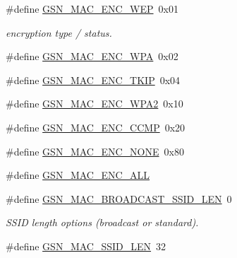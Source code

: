 \begin{DoxyCompactItemize}
\item 
\#define \hyperlink{a00642_ga97e73490c2ebf96dc976cfa9819ca342}{GSN\_\-MAC\_\-ENC\_\-WEP}~0x01
\begin{DoxyCompactList}\small\item\em encryption type / status. \end{DoxyCompactList}\item 
\#define \hyperlink{a00642_ga41cad5522df15c08084272449a15f488}{GSN\_\-MAC\_\-ENC\_\-WPA}~0x02
\item 
\#define \hyperlink{a00642_gae50c827781cd44789ebc5ace15ce7fac}{GSN\_\-MAC\_\-ENC\_\-TKIP}~0x04
\item 
\#define \hyperlink{a00642_gad400c18aedc0468b5338a51ddfd65803}{GSN\_\-MAC\_\-ENC\_\-WPA2}~0x10
\item 
\#define \hyperlink{a00642_gaaec086a1c50b8286b787d02bedd41fbf}{GSN\_\-MAC\_\-ENC\_\-CCMP}~0x20
\item 
\#define \hyperlink{a00642_gaa8b7bb2627d27e63f25be3787fa8abc1}{GSN\_\-MAC\_\-ENC\_\-NONE}~0x80
\item 
\#define \hyperlink{a00642_gae6f462d0bcd3c5811fb25ec43699b8c8}{GSN\_\-MAC\_\-ENC\_\-ALL}
\end{DoxyCompactItemize}
\begin{DoxyCompactItemize}
\item 
\#define \hyperlink{a00642_gaa9374ba371dac462bbc520ad04eb91a1}{GSN\_\-MAC\_\-BROADCAST\_\-SSID\_\-LEN}~0
\begin{DoxyCompactList}\small\item\em SSID length options (broadcast or standard). \end{DoxyCompactList}\item 
\#define \hyperlink{a00642_gabc6a02f5958aac465500370ca12dd011}{GSN\_\-MAC\_\-SSID\_\-LEN}~32
\end{DoxyCompactItemize}
